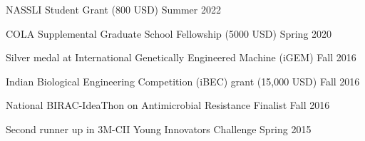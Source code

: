 NASSLI Student Grant (800 USD) \hfill Summer 2022

COLA Supplemental Graduate School Fellowship (5000 USD) \hfill Spring 2020

Silver medal at International Genetically Engineered Machine (iGEM) \hfill Fall 2016

Indian Biological Engineering Competition (iBEC) grant (15,000 USD) \hfill Fall 2016

National BIRAC-IdeaThon on Antimicrobial Resistance Finalist \hfill Fall 2016

Second runner up in 3M-CII Young Innovators Challenge \hfill Spring 2015

